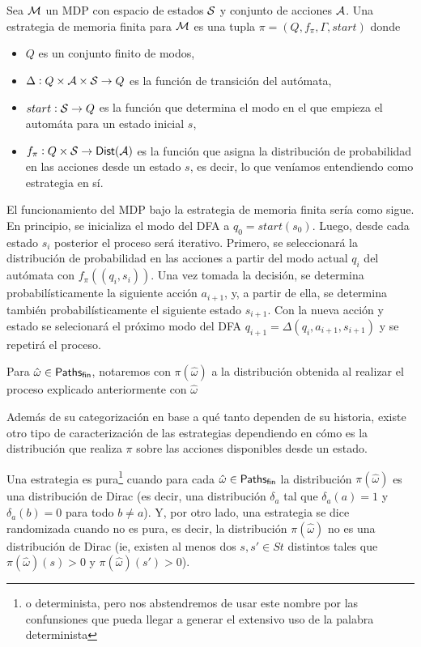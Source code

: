 \begin{definition}
	Sea $\mathcal{M}$ un MDP con espacio de estados $\mathcal{S}$ y conjunto de acciones $\mathcal{A}$. Una estrategia de memoria finita para $\mathcal{M}$ es una tupla $\pi = (Q, f_\pi, \Gamma, start)$ donde
	\begin{itemize}
		\item $Q$ es un conjunto finito de modos,
		\item $\Delta : Q \times \mathcal{A} \times \mathcal{S} \rightarrow Q$ es la función de transición del autómata,
		\item $start: \mathcal{S} \rightarrow Q$ es la función que determina el modo en el que empieza el automáta para un estado inicial $s$,
		\item $f_\pi : Q \times \mathcal{S} \rightarrow \mathsf{Dist}(\mathcal{A})$ es la función que asigna la distribución de probabilidad en las acciones desde un estado $s$, es decir, lo que veníamos entendiendo como estrategia en sí.
	\end{itemize}
	El funcionamiento del MDP bajo la estrategia de memoria finita sería como sigue. En principio, se inicializa el modo del DFA a $q_0 = start(s_0)$. Luego, desde cada estado $s_i$ posterior el proceso será iterativo. Primero, se seleccionará la distribución de probabilidad en las acciones a partir del modo actual $q_i$ del autómata con $f_\pi((q_i,s_i))$. Una vez tomada la decisión, se determina probabilísticamente la siguiente acción $a_{i+1}$, y, a partir de ella, se determina también probabilísticamente el siguiente estado $s_{i+1}$. Con la nueva acción y estado se selecionará el próximo modo del DFA $q_{i+1} = \Delta(q_i, a_{i+1}, s_{i+1})$ y se repetirá el proceso.

	Para $\hat \omega \in \textsf{Paths}_\textsf{fin}$, notaremos con $\pi(\hat \omega)$ a la
	distribución obtenida al realizar el proceso explicado anteriormente con $\hat
		\omega$
\end{definition}

Además de su categorización en base a qué tanto dependen de su historia, existe
otro tipo de caracterización de las estrategias dependiendo en cómo es la
distribución que realiza $\pi$ sobre las acciones disponibles desde un estado.

Una estrategia es pura\footnote{o determinista, pero nos abstendremos de usar
	este nombre por las confunsiones que pueda llegar a generar el extensivo uso de
	la palabra determinista} cuando para cada $\hat \omega \in \textsf{Paths}_\textsf{fin}$ la
distribución $\pi(\hat \omega)$ es una distribución de Dirac (es decir, una
distribución $\delta_a$ tal que $\delta_a(a) = 1$ y $\delta_a(b) = 0$ para todo
$b \neq a$). Y, por otro lado, una estrategia se dice randomizada cuando no es
pura, es decir, la distribución $\pi(\hat \omega)$ no es una distribución de
Dirac (ie, existen al menos dos $s, s' \in St$ distintos tales que $\pi(\hat
	\omega)(s) > 0$ y $\pi(\hat \omega)(s') > 0$).

